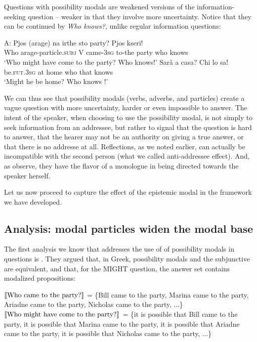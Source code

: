 \documentclass[output=paper,colorlinks,citecolor=brown]{langscibook}
\begin{document}
Questions with possibility modals are weakened versions of the information-seeking question --  weaker in that they involve more uncertainty. Notice that  they  can be continued by \textit{Who knows?}, unlike regular information questions:
 
 
\ea A: 
\gll Pjos (arage) na irthe sto party? Pjos kseri! \\
Who \hphantom{(}arage-particle\textsc{.subj} V came\textsc{-3sg} to-the party  who knows\\
\glt `Who might have come to the party?  Who knows!'
\ex
\gll Sar\`a a casa? Chi lo sa!\\ 
be\textsc{.fut.3sg} at home who that knows \\ 
\glt `Might he be home? Who knows !'
 \z

We can thus see that possibility modals  (verbs, adverbs, and particles) create a vague question with more uncertainty,  harder or even impossible to answer. The intent of the speaker, when choosing to use the possibility modal, is not simply to seek information from an addressee, but rather to signal that the question is hard to answer,  that the hearer may not be an authority on giving a true answer, or that there is no addresse at all. Reflections, as we noted earlier, can actually be incompatible with the second person  (what we called anti-addressee effect). And, as \citet{kang2019} observe, they have the flavor of a monologue in being directed towards the speaker herself. 

Let us now proceed to capture the effect of the epistemic modal in the framework we have developed. 

\subsection{Analysis: modal particles widen the modal base}

The first analysis we know that addresses the use of of possibility modals in questions is \citet{giannakidoumari2016}. They argued that, in Greek, possibility modals and the subjunctive are equivalent, and that, for the \textsc{MIGHT} question, the answer set contains modalized propositions:

\ea
$\llbracket\mbox{Who came to the party?}\rrbracket\textsuperscript{\ensuremath{ }}$ = \{Bill came to the party, Marina came to the party, Ariadne came to the party, Nicholas came to the party, ...\} \label{17}
\ex
$\llbracket\mbox{Who might have come to the party?}\rrbracket\textsuperscript{\ensuremath{ }}$ = \{it is possible that Bill came to the party, it is possible that Marina came to the party, it is possible that  Ariadne came to the party,  it is possible that Nicholas came to the party, ...\} \label{18}
\z
\end{document}
